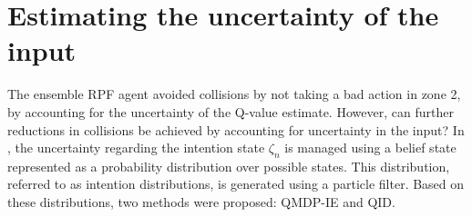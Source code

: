\section{Estimating the uncertainty of the input}
The ensemble RPF agent avoided collisions by not taking a bad action in zone 2, by accounting for the uncertainty of the Q-value estimate. However, can further reductions in collisions be achieved by accounting for uncertainty in the input? 
In \paperBelief, the uncertainty regarding the intention state $\zeta_n$ is managed using a belief state represented as a probability distribution over possible states. This distribution, referred to as intention distributions, is generated using a particle filter. Based on these distributions, two methods were proposed: QMDP-IE and QID.

% 			


